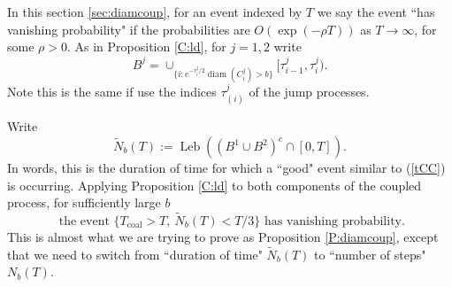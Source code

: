 \documentclass[12pt]{article}
\newcommand{\Tcouple}{T_{\mathrm{coal}}}
\DeclareMathOperator{\diam}{diam}
\DeclareMathOperator{\Leb}{Leb}
\begin{document}
In this section \ref{sec:diamcoup}, for an event indexed by $T$ we say the event
``has vanishing probability" if the probabilities are $O(\exp(- \rho T))$ as $T \to \infty$, for some $\rho > 0$.
As in Proposition \ref{C:ld}, for $j = 1,2$ write
\[ B^j  = \cup_{ \{i:   
e^{-\tau^j_i/2} \diam(C^j_{i}) > b 
\}} 
[\tau^j_{i-1}, \tau^j_{i}) . \] 
Note this is the same if use the indices $\tau^j_{(i)}$ of the jump processes.


Write
\[ \widetilde{N}_b(T) := \Leb ((B^1 \cup B^2)^c \cap [0,T] ) .\] 
In words, this is the duration of time for which a ``good" event similar to (\ref{tCC}) is occurring. 
Applying Proposition \ref{C:ld} to both components of the coupled process, for sufficiently large $b$ 
\begin{equation}
 \mbox{ the event } \{\Tcouple > T, \    \widetilde{N}_b(T)  < T/3   \} 
\mbox{ has vanishing probability}. 
\label{TcTv}
\end{equation}
This is almost what we are trying to prove as Proposition \ref{P:diamcoup}, 
except that we need to switch from ``duration of time" $ \widetilde{N}_b(T)$ to ``number of steps" $N_b(T)$.
\end{document}
